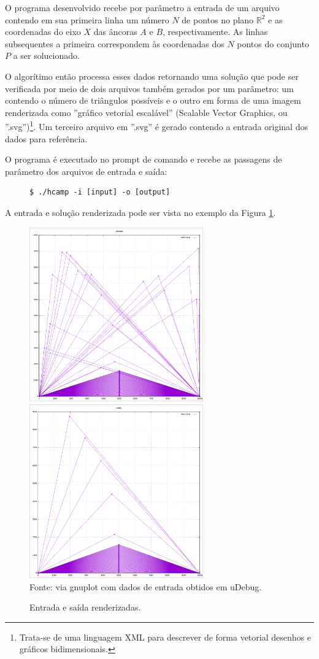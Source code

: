\documentclass[12pt,a4paper]{article}
\begin{document}
O programa desenvolvido recebe por parâmetro a entrada de um arquivo contendo em sua primeira linha um número $N$ de pontos no plano $\mathbb{R}^2$ e as coordenadas do eixo $X$ das âncoras $A$ e $B$, respectivamente. As linhas subsequentes a primeira correspondem às coordenadas dos $N$ pontos do conjunto $P$ a ser solucionado.

O algorítimo então processa esses dados retornando uma solução que pode ser verificada por meio de dois arquivos também gerados por um parâmetro: um contendo o número de triângulos possíveis e o outro em forma de uma imagem renderizada como ''gráfico vetorial escalável'' (Scalable Vector Graphics, ou ''.svg'')\footnote{Trata-se de uma linguagem XML para descrever de forma vetorial desenhos e gráficos bidimensionais.}. Um terceiro arquivo em ''.svg'' é gerado contendo a entrada original dos dados para referência.

O programa é executado no prompt de comando e recebe as passagens de parâmetro dos arquivos de entrada e saída:

\begin{figure}[!h]
\centering
\begin{BVerbatim}
$ ./hcamp -i [input] -o [output]
\end{BVerbatim}
\end{figure}

A entrada e solução renderizada pode ser vista no exemplo da Figura \ref{fig:inrend}.

\begin{figure}[!h]
	\caption{Entrada e saída renderizadas.}
	\label{fig:inrend}
	\includegraphics[width=75mm]{input.png}
	\hfill
	\includegraphics[width=75mm]{output.png}\\
	\footnotesize Fonte: via gnuplot com dados de entrada obtidos em uDebug.\cite{uri:vitor}
\end{figure}
\end{document}
